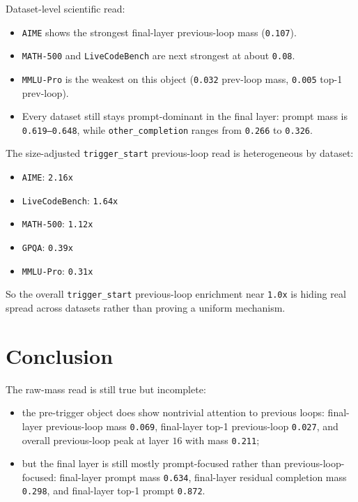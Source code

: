 \documentclass[11pt]{article}
\begin{document}
Dataset-level scientific read:

\begin{itemize}
  \item \texttt{AIME} shows the strongest final-layer previous-loop mass (\texttt{0.107}).
  \item \texttt{MATH-500} and \texttt{LiveCodeBench} are next strongest at about \texttt{0.08}.
  \item \texttt{MMLU-Pro} is the weakest on this object (\texttt{0.032} prev-loop mass, \texttt{0.005} top-1 prev-loop).
  \item Every dataset still stays prompt-dominant in the final layer: prompt mass is \texttt{0.619--0.648}, while \texttt{other\_completion} ranges from \texttt{0.266} to \texttt{0.326}.
\end{itemize}

The size-adjusted \texttt{trigger\_start} previous-loop read is heterogeneous by dataset:

\begin{itemize}
  \item \texttt{AIME}: \texttt{2.16x}
  \item \texttt{LiveCodeBench}: \texttt{1.64x}
  \item \texttt{MATH-500}: \texttt{1.12x}
  \item \texttt{GPQA}: \texttt{0.39x}
  \item \texttt{MMLU-Pro}: \texttt{0.31x}
\end{itemize}

So the overall \texttt{trigger\_start} previous-loop enrichment near \texttt{1.0x} is hiding real spread across datasets rather than proving a uniform mechanism.

\section*{Conclusion}

The raw-mass read is still true but incomplete:

\begin{itemize}
  \item the pre-trigger object does show nontrivial attention to previous loops:
    final-layer previous-loop mass \texttt{0.069}, final-layer top-1 previous-loop \texttt{0.027}, and overall previous-loop peak at layer $16$ with mass \texttt{0.211};
  \item but the final layer is still mostly prompt-focused rather than previous-loop-focused:
    final-layer prompt mass \texttt{0.634}, final-layer residual completion mass \texttt{0.298}, and final-layer top-1 prompt \texttt{0.872}.
\end{itemize}
\end{document}
